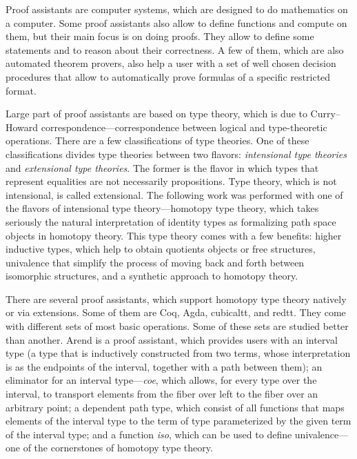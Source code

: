 \Introduction

Proof assistants are computer systems, which are designed to do mathematics on a computer. Some proof assistants also allow to define functions and compute on them, but their main focus is on doing proofs. They allow to define some statements and to reason about their correctness. A few of them, which are also automated theorem provers, also help a user with a set of well chosen decision procedures that allow to automatically prove formulas of a specific restricted format\autocite{ProofAssistants1}.

Large part of proof assistants are based on type theory, which is due to Curry–Howard correspondence---correspondence between logical and type-theoretic operations. There are a few classifications of type theories. One of these classifications divides type theories between two flavors: \textit{intensional type theories} and \textit{extensional type theories}. The former is the flavor in which types that represent equalities are not necessarily propositions. Type theory, which is not intensional, is called extensional. The following work was performed with one of the flavors of intensional type theory---homotopy type theory, which takes seriously the natural interpretation of identity types as formalizing path space objects in homotopy theory. This type theory comes with a few benefits: higher inductive types, which help to obtain quotients objects or free structures, univalence that simplify the process of moving back and forth between isomorphic structures, and a synthetic approach to homotopy theory.

There are several proof assistants, which support homotopy type theory natively or via extensions. Some of them are Coq\autocite{Coq}, Agda\autocite{Agda}, cubicaltt\autocite{Cubicaltt}, and redtt\autocite{Redtt}. They come with different sets of most basic operations. Some of these sets are studied better than another. Arend\autocite{Arend} is a proof assistant, which provides users with an interval type (a type that is inductively constructed from two terms, whose interpretation is as the endpoints of the interval, together with a path between them); an eliminator for an interval type---\textit{coe}, which allows, for every type over the interval, to transport elements from the fiber over left to the fiber over an arbitrary point; a dependent path type, which consist of all functions that maps elements of the interval type to the term of type parameterized by the given term of the interval type; and a function \textit{iso}, which can be used to define univalence---one of the cornerstones of homotopy type theory\autocite{Arenddocs}\autocite{nlab}.

